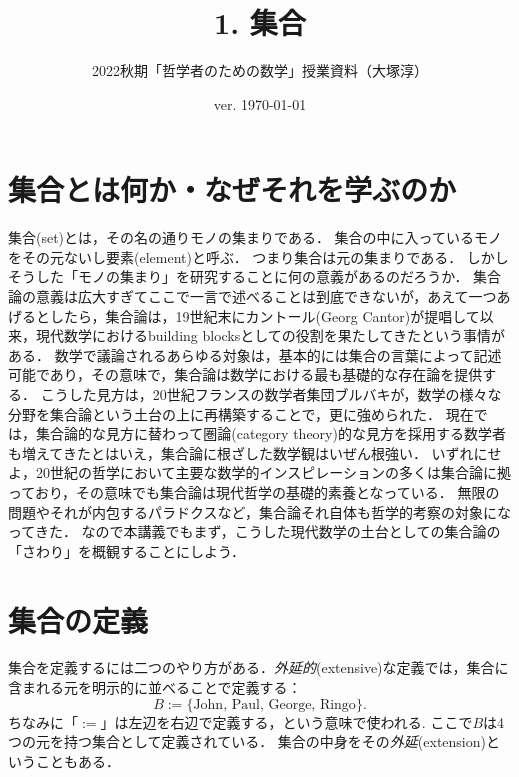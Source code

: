 \documentclass[11pt,a4paper]{jsarticle}
\begin{document}
\title{1. 集合}
\author{2022秋期「哲学者のための数学」授業資料（大塚淳）}
\date{ver. \today}
\maketitle



\section{集合とは何か・なぜそれを学ぶのか}

集合(set)とは，その名の通りモノの集まりである．
集合の中に入っているモノをその元ないし要素(element)と呼ぶ．
つまり集合は元の集まりである．
しかしそうした「モノの集まり」を研究することに何の意義があるのだろうか．
集合論の意義は広大すぎてここで一言で述べることは到底できないが，あえて一つあげるとしたら，集合論は，19世紀末にカントール(Georg Cantor)が提唱して以来，現代数学におけるbuilding blocksとしての役割を果たしてきたという事情がある．
数学で議論されるあらゆる対象は，基本的には集合の言葉によって記述可能であり，その意味で，集合論は数学における最も基礎的な存在論を提供する．
こうした見方は，20世紀フランスの数学者集団ブルバキが，数学の様々な分野を集合論という土台の上に再構築することで，更に強められた．
現在では，集合論的な見方に替わって圏論(category theory)的な見方を採用する数学者も増えてきたとはいえ，集合論に根ざした数学観はいぜん根強い．
いずれにせよ，20世紀の哲学において主要な数学的インスピレーションの多くは集合論に拠っており，その意味でも集合論は現代哲学の基礎的素養となっている．
無限の問題やそれが内包するパラドクスなど，集合論それ自体も哲学的考察の対象になってきた．
なので本講義でもまず，こうした現代数学の土台としての集合論の「さわり」を概観することにしよう．




\section{集合の定義}

集合を定義するには二つのやり方がある．\emph{外延的}(extensive)な定義では，集合に含まれる元を明示的に並べることで定義する：
\[
 B := \{\text{John, Paul, George, Ringo}\}.
\]
ちなみに「$:=$」は左辺を右辺で定義する，という意味で使われる.
ここで$B$は4つの元を持つ集合として定義されている．
集合の中身をその\emph{外延}(extension)ということもある．
\end{document}
